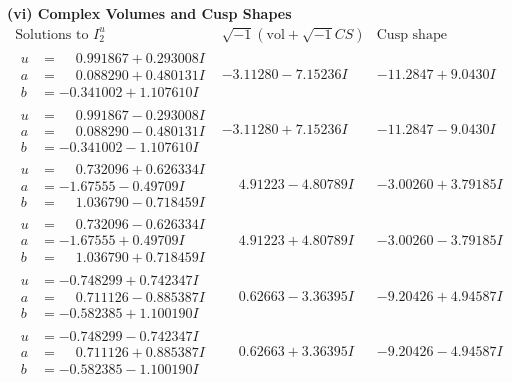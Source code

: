 \documentclass[1p]{elsarticle_modified}
\theoremstyle{definition}
\newcommand{\I}{\sqrt{-1}}
\begin{document}
\newpage\flushleft \textbf{(vi) Complex Volumes and Cusp Shapes}
$$\begin{array}{c|c|c}  
\text{Solutions to }I^u_{2}& \I (\text{vol} + \sqrt{-1}CS) & \text{Cusp shape}\\
 \hline 
\begin{aligned}
u &= \phantom{-}0.991867 + 0.293008 I \\
a &= \phantom{-}0.088290 + 0.480131 I \\
b &= -0.341002 + 1.107610 I\end{aligned}
 & -3.11280 - 7.15236 I & -11.2847 + 9.0430 I \\ \hline\begin{aligned}
u &= \phantom{-}0.991867 - 0.293008 I \\
a &= \phantom{-}0.088290 - 0.480131 I \\
b &= -0.341002 - 1.107610 I\end{aligned}
 & -3.11280 + 7.15236 I & -11.2847 - 9.0430 I \\ \hline\begin{aligned}
u &= \phantom{-}0.732096 + 0.626334 I \\
a &= -1.67555 - 0.49709 I \\
b &= \phantom{-}1.036790 - 0.718459 I\end{aligned}
 & \phantom{-}4.91223 - 4.80789 I & -3.00260 + 3.79185 I \\ \hline\begin{aligned}
u &= \phantom{-}0.732096 - 0.626334 I \\
a &= -1.67555 + 0.49709 I \\
b &= \phantom{-}1.036790 + 0.718459 I\end{aligned}
 & \phantom{-}4.91223 + 4.80789 I & -3.00260 - 3.79185 I \\ \hline\begin{aligned}
u &= -0.748299 + 0.742347 I \\
a &= \phantom{-}0.711126 - 0.885387 I \\
b &= -0.582385 + 1.100190 I\end{aligned}
 & \phantom{-}0.62663 - 3.36395 I & -9.20426 + 4.94587 I \\ \hline\begin{aligned}
u &= -0.748299 - 0.742347 I \\
a &= \phantom{-}0.711126 + 0.885387 I \\
b &= -0.582385 - 1.100190 I\end{aligned}
 & \phantom{-}0.62663 + 3.36395 I & -9.20426 - 4.94587 I \\ \hline\begin{aligned}

\end{aligned}
\end{array}$$
\end{document}
